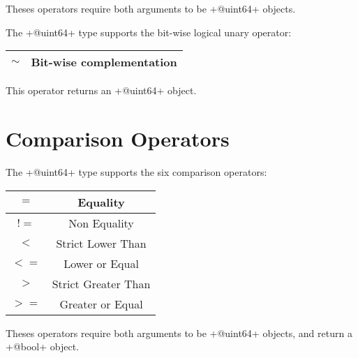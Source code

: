 Theses operators require both arguments to be \ggs+@uint64+ objects.\newline


The \ggs+@uint64+ type supports the bit-wise logical unary operator:

\begin{tabular}{|c|c|}
  \hline
  $\sim$ & Bit-wise complementation \\
  \hline
\end{tabular}

This operator returns an \ggs+@uint64+ object.




\section{Comparison Operators}

The \ggs+@uint64+ type supports the six comparison operators:

\begin{tabular}{|c|c|}
\hline
$=$ & Equality \\
\hline
$!=$ & Non Equality \\
\hline
$<$  & Strict Lower Than \\
\hline
$<=$  & Lower or Equal \\
\hline
$>$  & Strict Greater Than \\
\hline
$>=$  & Greater or Equal \\
\hline
\end{tabular}

Theses operators require both arguments to be \ggs+@uint64+ objects, and return a \ggs+@bool+ object.
